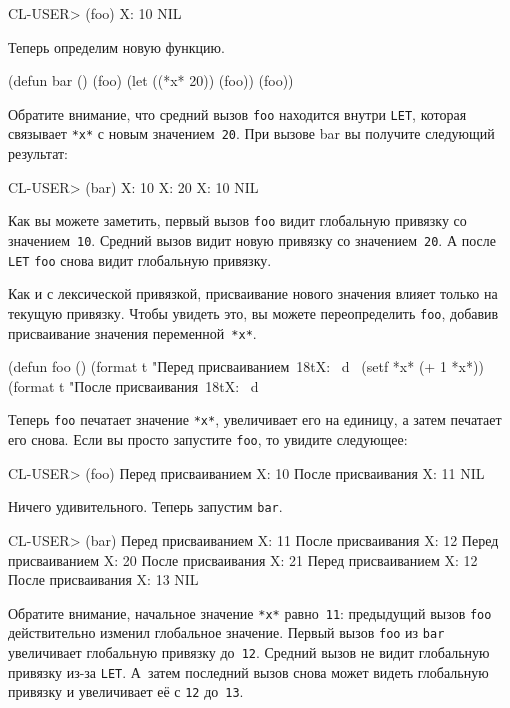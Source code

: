 \begin{myverb}
CL-USER> (foo)
X: 10
NIL
\end{myverb}

Теперь определим новую функцию.

\begin{myverb}
(defun bar ()
  (foo)
  (let ((*x* 20)) (foo))
  (foo))
\end{myverb}

Обратите внимание, что средний вызов \lstinline{foo} находится внутри \lstinline{LET}, которая связывает
\lstinline{*x*} с новым значением~\lstinline{20}. При вызове bar вы получите следующий результат:

\begin{myverb}
CL-USER> (bar)
X: 10
X: 20
X: 10
NIL
\end{myverb}

Как вы можете заметить, первый вызов \lstinline{foo} видит глобальную привязку со
значением~\lstinline{10}. Средний вызов видит новую привязку со значением~\lstinline{20}. А после
\lstinline{LET} \lstinline{foo} снова видит глобальную привязку.

Как и с лексической привязкой, присваивание нового значения влияет только на текущую
привязку. Чтобы увидеть это, вы можете переопределить \lstinline{foo}, добавив присваивание значения
переменной~\lstinline{*x*}.

\begin{myverb}
(defun foo ()
  (format t "Перед присваиванием~18tX: ~d~%
  (setf *x* (+ 1 *x*))
  (format t "После присваивания~18tX: ~d~%
\end{myverb}

Теперь \lstinline{foo} печатает значение \lstinline{*x*}, увеличивает его на единицу, а затем
печатает его снова. Если вы просто запустите \lstinline{foo}, то увидите следующее:

\begin{myverb}
CL-USER> (foo)
Перед присваиванием X: 10
После присваивания  X: 11
NIL
\end{myverb}

Ничего удивительного. Теперь запустим \lstinline{bar}.

\begin{myverb}
CL-USER> (bar)
Перед присваиванием X: 11
После присваивания  X: 12
Перед присваиванием X: 20
После присваивания  X: 21
Перед присваиванием X: 12
После присваивания  X: 13
NIL
\end{myverb}

Обратите внимание, начальное значение \lstinline{*x*} равно~\lstinline{11}: предыдущий вызов
\lstinline{foo} действительно изменил глобальное значение. Первый вызов \lstinline{foo} из
\lstinline{bar} увеличивает глобальную привязку до~\lstinline{12}. Средний вызов не видит глобальную
привязку из-за \lstinline{LET}. А~затем последний вызов снова может видеть глобальную
привязку и увеличивает её с \lstinline{12} до~\lstinline{13}.

